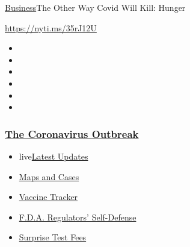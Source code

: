 \href{/section/business}{Business}\textbar{}The Other Way Covid Will
Kill: Hunger

\url{https://nyti.ms/35rJ12U}

\begin{itemize}
\item
\item
\item
\item
\item
\item
\end{itemize}

\hypertarget{the-coronavirus-outbreak}{%
\subsubsection{\texorpdfstring{\href{https://www.nytimes3xbfgragh.onion/news-event/coronavirus?name=styln-coronavirus-markets\&region=TOP_BANNER\&block=storyline_menu_recirc\&action=click\&pgtype=Article\&impression_id=50c431f0-f52d-11ea-a21f-29f6111ec990\&variant=undefined}{The
Coronavirus
Outbreak}}{The Coronavirus Outbreak}}\label{the-coronavirus-outbreak}}

\begin{itemize}
\tightlist
\item
  live\href{https://www.nytimes3xbfgragh.onion/2020/09/12/world/covid-19-coronavirus.html?name=styln-coronavirus-markets\&region=TOP_BANNER\&block=storyline_menu_recirc\&action=click\&pgtype=Article\&impression_id=50c431f1-f52d-11ea-a21f-29f6111ec990\&variant=undefined}{Latest
  Updates}
\item
  \href{https://www.nytimes3xbfgragh.onion/interactive/2020/us/coronavirus-us-cases.html?name=styln-coronavirus-markets\&region=TOP_BANNER\&block=storyline_menu_recirc\&action=click\&pgtype=Article\&impression_id=50c431f2-f52d-11ea-a21f-29f6111ec990\&variant=undefined}{Maps
  and Cases}
\item
  \href{https://www.nytimes3xbfgragh.onion/interactive/2020/science/coronavirus-vaccine-tracker.html?name=styln-coronavirus-markets\&region=TOP_BANNER\&block=storyline_menu_recirc\&action=click\&pgtype=Article\&impression_id=50c431f3-f52d-11ea-a21f-29f6111ec990\&variant=undefined}{Vaccine
  Tracker}
\item
  \href{https://www.nytimes3xbfgragh.onion/2020/09/10/us/politics/fda-coronavirus-vaccine.html?name=styln-coronavirus-markets\&region=TOP_BANNER\&block=storyline_menu_recirc\&action=click\&pgtype=Article\&impression_id=50c431f4-f52d-11ea-a21f-29f6111ec990\&variant=undefined}{F.D.A.
  Regulators' Self-Defense}
\item
  \href{https://www.nytimes3xbfgragh.onion/2020/09/09/upshot/coronavirus-surprise-test-fees.html?name=styln-coronavirus-markets\&region=TOP_BANNER\&block=storyline_menu_recirc\&action=click\&pgtype=Article\&impression_id=50c431f5-f52d-11ea-a21f-29f6111ec990\&variant=undefined}{Surprise
  Test Fees}
\end{itemize}

